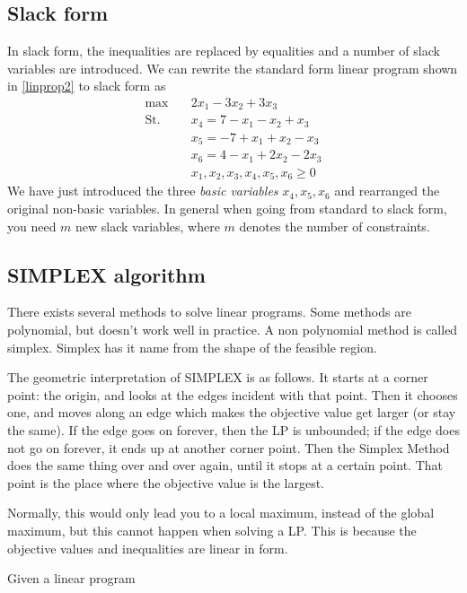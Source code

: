 \documentclass[10pt]{article}
\begin{document}
\subsection{Slack form} %
\label{sub:slack_form}
In slack form, the inequalities are replaced by equalities and a number of slack variables are introduced. We can rewrite the standard form linear program shown in \ref{linprop2} to slack form as
\begin{align*}
 \max &\quad 2x_1 - 3x_2 +3x_3 \\ 
 \text{St.} &\quad  x_4 = 7 - x_1 - x_2 + x_3\\
            &\quad  x_5 = -7 + x_1 + x_2 -x_3\\
            &\quad  x_6 = 4 -x_1 + 2x_2 -2x_3\\
            &\quad  x_1, x_2, x_3, x_4, x_5, x_6    \geq 0  
\end{align*}
We have just introduced the three \emph{basic variables} $x_4,x_5,x_6$ and rearranged the original non-basic variables. In general when going from standard to slack form, you need $m$ new slack variables, where $m$ denotes the number of constraints.

\subsection{SIMPLEX algorithm} %
\label{sub:simplex_algorithm}
There exists several methods to solve linear programs. Some methods are polynomial, but doesn't work well in practice. A non polynomial method is called simplex. Simplex has it name from the shape of the feasible region.

The geometric interpretation of SIMPLEX is as follows. It starts at a corner point: the origin, and looks at the edges incident with that point. Then it chooses one, and moves along an edge which makes the objective value get larger (or stay the same). If the edge goes on forever, then the LP is unbounded; if the edge does not go on forever, it ends up at another corner point. Then the Simplex Method does the same thing over and over again, until it stops at a certain point. That point is the place where the objective value is the largest.


Normally, this would only lead you to a local maximum, instead of the global maximum, but this cannot happen when solving a LP. This is because the objective values and inequalities are linear in form.

Given a linear program
\end{document}
